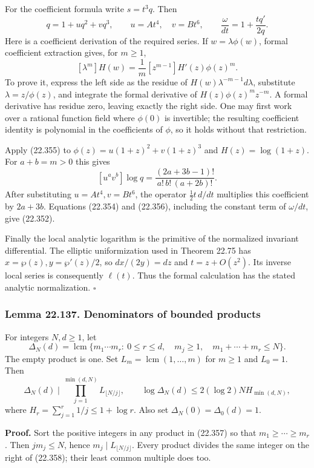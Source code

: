 \documentclass[
  11pt,
  a4paper,
]{article}
\begin{document}
For the coefficient formula write \(s=t^3q\). Then \[
 q=1+u q^2+v q^3,\qquad u=At^4,\quad v=Bt^6,
 \qquad \frac{\omega}{dt}=1+\frac{tq'}{2q}.
 \tag{22.354}
\] Here is a coefficient derivation of the required series. If
\(w=\lambda\phi(w)\), formal coefficient extraction gives, for
\(m\ge1\), \[
 [\lambda^m]H(w)=\frac1m[z^{m-1}]H'(z)\phi(z)^m.
 \tag{22.355}
\] To prove it, express the left side as the residue of
\(H(w)\lambda^{-m-1}d\lambda\), substitute \(\lambda=z/\phi(z)\), and
integrate the formal derivative of \(H(z)\phi(z)^m z^{-m}\). A formal
derivative has residue zero, leaving exactly the right side. One may
first work over a rational function field where \(\phi(0)\) is
invertible; the resulting coefficient identity is polynomial in the
coefficients of \(\phi\), so it holds without that restriction.

Apply (22.355) to \(\phi(z)=u(1+z)^2+v(1+z)^3\) and \(H(z)=\log(1+z)\).
For \(a+b=m>0\) this gives \[
 [u^av^b]\log q
  =\frac{(2a+3b-1)!}{a!\,b!\,(a+2b)!}.
 \tag{22.356}
\] After substituting \(u=At^4,v=Bt^6\), the operator
\(\tfrac12t\,d/dt\) multiplies this coefficient by \(2a+3b\). Equations
(22.354) and (22.356), including the constant term of \(\omega/dt\),
give (22.352).

Finally the local analytic logarithm is the primitive of the normalized
invariant differential. The elliptic uniformization used in Theorem
22.75 has \(x=\wp(z),y=\wp'(z)/2\), so \(dx/(2y)=dz\) and
\(t=z+O(z^2)\). Its inverse local series is consequently \(\ell(t)\).
Thus the formal calculation has the stated analytic normalization.
\(\square\)

\subsubsection{Lemma 22.137. Denominators of bounded
products}\label{lemma-22.137.-denominators-of-bounded-products}

For integers \(N,d\ge1\), let \[
 \Delta_N(d)=\operatorname{lcm}
 \{m_1\cdots m_r:\ 0\le r\le d,\quad
                 m_j\ge1,\quad m_1+\cdots+m_r\le N\}.
 \tag{22.357}
\] The empty product is one. Set \(L_m=\operatorname{lcm}(1,\ldots,m)\)
for \(m\ge1\) and \(L_0=1\). Then \[
 \Delta_N(d)\mid
       \prod_{j=1}^{\min(d,N)}L_{\lfloor N/j\rfloor},
 \qquad
 \log\Delta_N(d)\le
       2(\log2)N H_{\min(d,N)},
 \tag{22.358}
\] where \(H_r=\sum_{j=1}^r1/j\le1+\log r\). Also set
\(\Delta_N(0)=\Delta_0(d)=1\).

\textbf{Proof.} Sort the positive integers in any product in (22.357) so
that \(m_1\ge\cdots\ge m_r\). Then \(j m_j\le N\), hence
\(m_j\mid L_{\lfloor N/j\rfloor}\). Every product divides the same
integer on the right of (22.358); their least common multiple does too.
\end{document}
